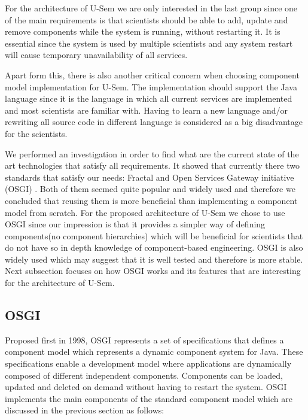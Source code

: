 For the architecture of U-Sem we are only interested in the last group since one of the main requirements is that scientists should be able to add, update and remove components while the system is running, without restarting it. It is essential since the system is used by multiple scientists and any system restart will cause temporary unavailability of all services. 

Apart form this, there is also another critical concern when choosing component model implementation for U-Sem. The implementation should support the Java language since it is the language in which all current services are implemented and most scientists are familiar with. Having to learn a new language and/or rewriting all source code in different language is considered as a big disadvantage for the scientists.

We performed an investigation in order to find what are the current state of the art technologies that satisfy all requirements. It showed that currently there two standards that satisfy our needs: Fractal \cite{Bruneton} and Open Services Gateway initiative (OSGI) \cite{OSGI}. Both of them seemed quite popular and widely used and therefore we concluded that reusing them is more beneficial than implementing a component model from scratch. For the proposed architecture of U-Sem we chose to use OSGI since our impression is that it provides a simpler way of defining components(no component hierarchies) which will be beneficial for scientists that do not have so in depth knowledge of component-based engineering. OSGI is also widely used\cite{Andre} which may suggest that it is well tested and therefore is more stable. Next subsection focuses on how OSGI works and its features that are interesting for the architecture of U-Sem.


\subsection{OSGI}

Proposed first in 1998, OSGI represents a set of specifications that defines a component model which represents a dynamic component system for Java. These specifications enable a development model where applications are dynamically composed of different independent components. Components can be loaded, updated and deleted on demand without having to restart the system. OSGI implements the main components of the standard component model which are discussed in the previous section as follows:

